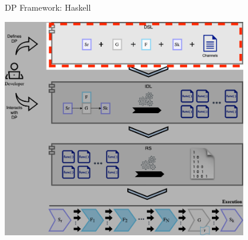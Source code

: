 \documentclass{beamer}
\begin{document}
    \begin{frame}[fragile]{DP Framework: Haskell}
      \begin{center}
      \includegraphics[width = 0.8\textwidth, height = 0.8\textheight]{dpf_haskell_v3-1}
    \end{center}
  \end{frame}

\end{document}
